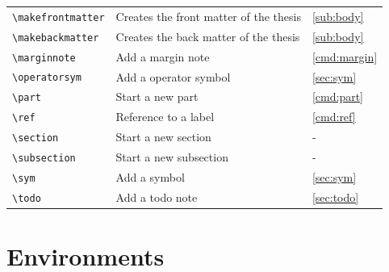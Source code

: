 \begin{tabularx}{\linewidth}{l X l}
    \verb|\makefrontmatter|&Creates the front matter of the thesis&\autoref{sub:body}\\
    \verb|\makebackmatter|&Creates the back matter of the thesis&\autoref{sub:body}\\
    \verb|\marginnote|&Add a margin note&\autoref{cmd:margin}\\
    \verb|\operatorsym|&Add a operator symbol&\autoref{sec:sym}\\
    \verb|\part|&Start a new part&\autoref{cmd:part}\\
    \verb|\ref|&Reference to a label&\autoref{cmd:ref}\\
    \verb|\section|&Start a new section&-\\
    \verb|\subsection|&Start a new subsection&-\\
    \verb|\sym|&Add a symbol&\autoref{sec:sym}\\
    \verb|\todo|&Add a todo note&\autoref{sec:todo}\\
    \bottomrule
\end{tabularx}

\clearpage
\section{Environments}

